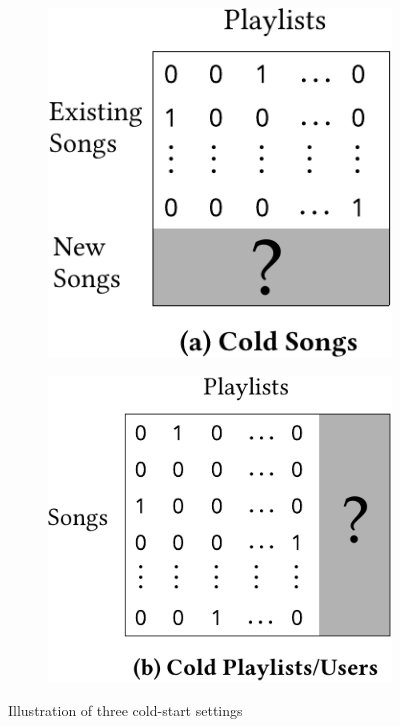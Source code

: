 \begin{figure}[t]
\begin{subfigure}{.5\columnwidth}
  \centering
  \includegraphics[width=.73\linewidth]{fig/fig_nsr.pdf}
  \label{fig:nsr}
\end{subfigure}%
\begin{subfigure}{.5\columnwidth}
  \centering
  \includegraphics[width=.85\linewidth]{fig/fig_gen.pdf}
  \label{fig:gen}
\end{subfigure}
\caption{Illustration of three cold-start settings}
\label{fig:settings}
\end{figure}





